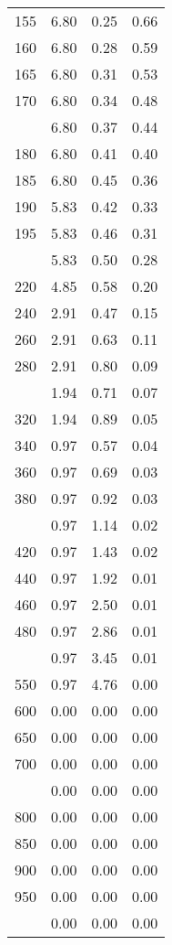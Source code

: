 \begin{table}[ht]
\begin{tabular}{lccc}
  155 & 6.80 & 0.25 & 0.66 \\ 
  160 & 6.80 & 0.28 & 0.59 \\ 
  165 & 6.80 & 0.31 & 0.53 \\ 
  170 & 6.80 & 0.34 & 0.48 \\ 
   \addlinespace
175 & 6.80 & 0.37 & 0.44 \\ 
  180 & 6.80 & 0.41 & 0.40 \\ 
  185 & 6.80 & 0.45 & 0.36 \\ 
  190 & 5.83 & 0.42 & 0.33 \\ 
  195 & 5.83 & 0.46 & 0.31 \\ 
   \addlinespace
200 & 5.83 & 0.50 & 0.28 \\ 
  220 & 4.85 & 0.58 & 0.20 \\ 
  240 & 2.91 & 0.47 & 0.15 \\ 
  260 & 2.91 & 0.63 & 0.11 \\ 
  280 & 2.91 & 0.80 & 0.09 \\ 
   \addlinespace
300 & 1.94 & 0.71 & 0.07 \\ 
  320 & 1.94 & 0.89 & 0.05 \\ 
  340 & 0.97 & 0.57 & 0.04 \\ 
  360 & 0.97 & 0.69 & 0.03 \\ 
  380 & 0.97 & 0.92 & 0.03 \\ 
   \addlinespace
400 & 0.97 & 1.14 & 0.02 \\ 
  420 & 0.97 & 1.43 & 0.02 \\ 
  440 & 0.97 & 1.92 & 0.01 \\ 
  460 & 0.97 & 2.50 & 0.01 \\ 
  480 & 0.97 & 2.86 & 0.01 \\ 
   \addlinespace
500 & 0.97 & 3.45 & 0.01 \\ 
  550 & 0.97 & 4.76 & 0.00 \\ 
  600 & 0.00 & 0.00 & 0.00 \\ 
  650 & 0.00 & 0.00 & 0.00 \\ 
  700 & 0.00 & 0.00 & 0.00 \\ 
   \addlinespace
750 & 0.00 & 0.00 & 0.00 \\ 
  800 & 0.00 & 0.00 & 0.00 \\ 
  850 & 0.00 & 0.00 & 0.00 \\ 
  900 & 0.00 & 0.00 & 0.00 \\ 
  950 & 0.00 & 0.00 & 0.00 \\ 
   \addlinespace
1000 & 0.00 & 0.00 & 0.00 \\ 
   \bottomrule
\end{tabular}
\end{table}
